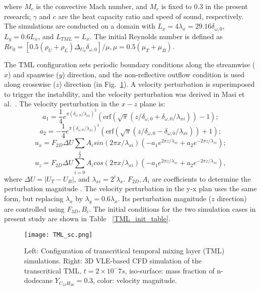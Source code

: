 where $M_c$ is the convective Mach number, and $M_c$ is fixed to 0.3 in the present research; $\gamma$ and $c$ are the heat capacity ratio and speed of sound, respectively. 
The simulations are conducted on a domain with $L_x = 4 \lambda_x = 29.16 \delta_{\omega,0}$, $L_y = 0.6 L_x$, and $L_{TML}=L_x$. 
The initial Reynolds number is defined as $Re_0 = [0.5(\rho_U +\rho_L)\Delta_{U_0} \delta_{\omega,0}]/\mu,\mu = 0.5 (\mu_T+\mu_B)$.

The TML configuration sets periodic boundary conditions along the streamwise ($x$) and spanwise ($y$) direction, and the non-reflective outflow condition is used along crosswise ($z$) direction (in Fig.~\ref{TML_GEO}). A velocity perturbation is superimposed to trigger the instability, and the velocity perturbation was derived in Masi et al.~\cite{masi2013multi}. The velocity perturbation in the $x-z$ plane is:
$$ a_1 = \frac{1}{4} e^{\pi (\delta_{\omega,0}/ \lambda_{xi})^2}(\textrm{erf}(\sqrt{\pi}(z/\delta_{\omega,0}+ \delta_{\omega,0}/\lambda_{xi}))-1);$$
$$ a_2 = -\frac{1}{4} e^{\pi (\delta_{\omega,0}/ \lambda_{xi})^2}(\textrm{erf}(\sqrt{\pi}(z/\delta_{\omega,0}- \delta_{\omega,0}/\lambda_{xi}))+1);$$
$$u_x = F_{2D} \Delta U \sum_i A_i sin(2\pi x/ \lambda_{xi}) (-a_1 e^{2\pi z / \lambda_{xi}}+a_2 e^{- 2\pi z / \lambda_{xi}});$$
$$u_z= F_{2D} \Delta U \sum_{i=0}^{2} A_i cos(2\pi x/ \lambda_{xi}) (-a_1 e^{2\pi z / \lambda_{xi}}+a_2 e^{- 2\pi z / \lambda_{xi}}),$$
where $\Delta U = |U_T-U_B|$, and $\lambda_{xi}=2^i\lambda_x$. $F_{2D}, A_i$ are coefficients to determine the perturbation magnitude \cite{masi2013multi}. The velocity perturbation in the y-x plan uses the same form, but replacing $\lambda_x$ by $\lambda_y = 0.6 \lambda_x$. Its perturbation magnitude ($z$ direction) are controlled using $F_{3D}, B_i$. The initial conditions for the two simulation cases in present study are shown in Table ~\ref{TML_init_table}.

\begin{figure}[htbp]
\centering

\texttt{[image: TML\_sc.png]}
\hspace{.2in}
\caption{Left: Configuration of transcritical temporal mixing layer (TML) simulations. Right: 3D VLE-based CFD simulation of the transcritical TML, $t=2\times 10^-7s$, iso-surface: mass fraction of n-dodecane $Y_{C_{12}H_{26}} = 0.3$, color: velocity magnitude.}
\label{TML_GEO} 
\end{figure}



